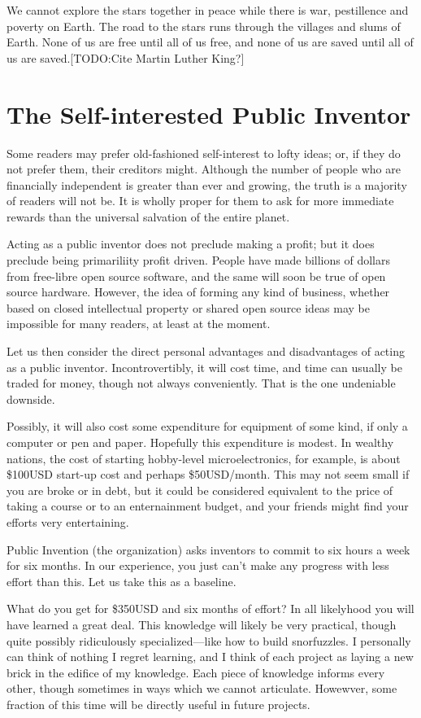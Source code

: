 \documentclass[
	fontsize=10pt, %
	twoside=false, %
	secnumdepth=1, %
]{kaobook}
\begin{document}
We cannot explore the stars together in peace while
there is war, pestillence and poverty on Earth.
The road to the stars runs through the villages and slums
of Earth. None of us are free until all of us free,
and none of us are saved until all of us are saved.[TODO:Cite Martin Luther King?]


\chapter{The Self-interested Public Inventor}

Some readers may prefer old-fashioned self-interest to
lofty ideas; or, if they do not prefer them, their creditors might.
Although the number of people who are financially independent is
greater than ever and growing, the truth is a majority of readers
will not be. It is wholly proper for them to ask for more immediate
rewards than the universal salvation of the entire planet.

Acting as a public inventor does not preclude making a profit;
but it does preclude being primariliity profit driven.
People have made billions of dollars from free-libre open source software,
and the same will soon be true of open source hardware.
However, the idea of forming any kind of business, whether based on
closed intellectual property or shared open source ideas may
be impossible for many readers, at least at the moment.

Let us then consider the direct personal advantages and disadvantages of
acting as a public inventor. Incontrovertibly, it will cost
time, and time can usually be traded for money, though not
always conveniently. That is the one undeniable downside.

Possibly, it will also cost some expenditure for equipment of
some kind, if only a computer or pen and paper.
Hopefully this expenditure is modest. In wealthy nations,
the cost of starting hobby-level microelectronics, for example,
is about \$100USD start-up cost and perhaps \$50USD/month.
This may not seem small if you are broke or in debt, but
it could be considered equivalent to the price of taking a course or to an enternainment
budget, and your friends might find your efforts very entertaining.

Public Invention (the organization) asks inventors to commit to six hours
a week for six months. In our experience, you just can't make any
progress with less effort than this. Let us take this as a baseline.

What do you get for \$350USD and six months of effort?
In all likelyhood you will have learned a great deal.
This knowledge will likely be very practical, though
quite possibly ridiculously specialized---like how to build snorfuzzles.
I personally can think of nothing I regret learning, and
I think of each project as laying a new brick in the
edifice of my knowledge. Each piece of knowledge
informs every other, though sometimes in ways which
we cannot articulate.
Howewver, some fraction of this time will be directly useful in future projects.
\end{document}
